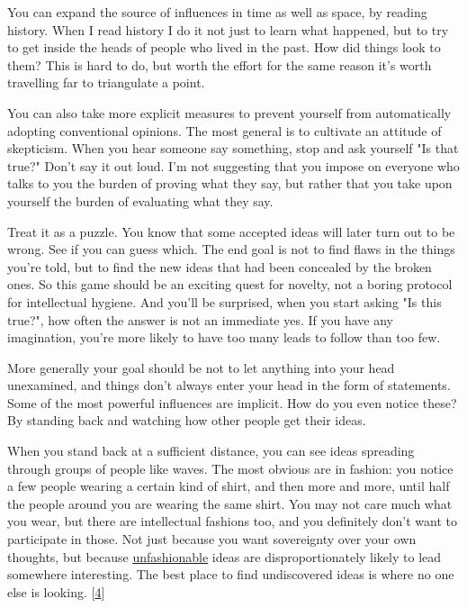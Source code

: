 You can
                  expand the source of influences in time as well as space, by
                  reading history. When I read history I do it not just to learn
                  what happened, but to try to get inside the heads of people
                  who lived in the past. How did things look to them? This is
                  hard to do, but worth the effort for the same reason it's
                  worth travelling far to triangulate a point.

You
                  can also take more explicit measures to prevent yourself from
                  automatically adopting conventional opinions. The most general
                  is to cultivate an attitude of skepticism. When you hear
                  someone say something, stop and ask yourself "Is that true?"
                  Don't say it out loud. I'm not suggesting that you impose on
                  everyone who talks to you the burden of proving what they say,
                  but rather that you take upon yourself the burden of
                  evaluating what they say.

Treat it as a puzzle. You
                  know that some accepted ideas will later turn out to be wrong.
                  See if you can guess which. The end goal is not to find flaws
                  in the things you're told, but to find the new ideas that had
                  been concealed by the broken ones. So this game should be an
                  exciting quest for novelty, not a boring protocol for
                  intellectual hygiene. And you'll be surprised, when you start
                  asking "Is this true?", how often the answer is not an
                  immediate yes. If you have any imagination, you're more likely
                  to have too many leads to follow than too few.

More
                  generally your goal should be not to let anything into your
                  head unexamined, and things don't always enter your head in
                  the form of statements. Some of the most powerful influences
                  are implicit. How do you even notice these? By standing back
                  and watching how other people get their ideas.

When
                  you stand back at a sufficient distance, you can see ideas
                  spreading through groups of people like waves. The most
                  obvious are in fashion: you notice a few people wearing a
                  certain kind of shirt, and then more and more, until half the
                  people around you are wearing the same shirt. You may not care
                  much what you wear, but there are intellectual fashions too,
                  and you definitely don't want to participate in those. Not
                  just because you want sovereignty over your own thoughts, but
                  because \href{http://www.paulgraham.com/nov.html}{\underline{unfashionable}}
                  ideas are disproportionately likely to lead somewhere
                  interesting. The best place to find undiscovered ideas is
                  where no one else is looking.
                  [\href{\#f4n}{4}]



